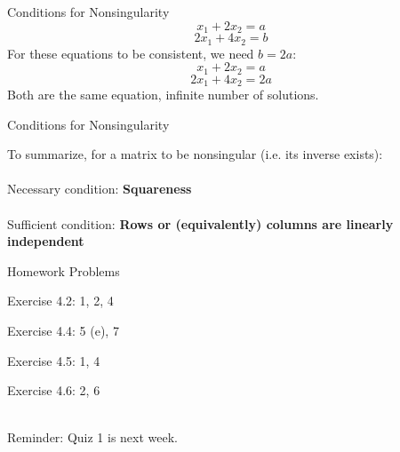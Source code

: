 \documentclass{./../../Latex/teaching_slides}
\begin{document}
  \begin{frame}{Conditions for Nonsingularity}
  $$ x_1+2x_2 = a $$
  $$ 2x_1+4x_2 = b $$
  For these equations to be consistent, we need $b=2a$:
  $$ x_1+2x_2 = a $$
  $$ 2x_1+4x_2 = 2a $$
  Both are the same equation, infinite number of solutions.
  \end{frame}
  
  \begin{frame}{Conditions for Nonsingularity}
  \vspace{1em}
  
  To summarize, for a matrix to be nonsingular (i.e. its inverse exists): \\~\\
  
  Necessary condition: \textbf{Squareness} \\~\\
  
  Sufficient condition: \textbf{Rows or (equivalently) columns are linearly independent} 
  
  \end{frame}

\begin{frame}{Homework Problems}
  \begin{witemize}
  \normalsize
  \item Exercise 4.2: 1, 2, 4
  \item Exercise 4.4: 5 (e), 7
  \item Exercise 4.5: 1, 4 
  \item Exercise 4.6: 2, 6 \\~\\
\end{witemize}
Reminder: Quiz 1 is next week.
\end{frame}
\end{document}
